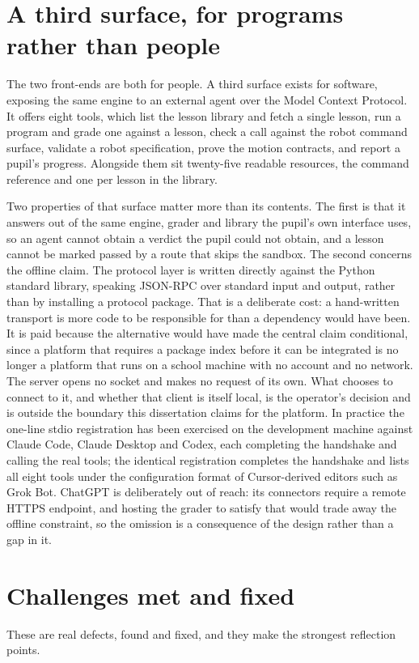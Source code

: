 \documentclass[11pt,a4paper]{report}
\begin{document}
\section{A third surface, for programs rather than people}
The two front-ends are both for people. A third surface exists for software, exposing the same engine to an external agent over the Model Context Protocol. It offers eight tools, which list the lesson library and fetch a single lesson, run a program and grade one against a lesson, check a call against the robot command surface, validate a robot specification, prove the motion contracts, and report a pupil's progress. Alongside them sit twenty-five readable resources, the command reference and one per lesson in the library.

Two properties of that surface matter more than its contents. The first is that it answers out of the same engine, grader and library the pupil's own interface uses, so an agent cannot obtain a verdict the pupil could not obtain, and a lesson cannot be marked passed by a route that skips the sandbox. The second concerns the offline claim. The protocol layer is written directly against the Python standard library, speaking JSON-RPC over standard input and output, rather than by installing a protocol package. That is a deliberate cost: a hand-written transport is more code to be responsible for than a dependency would have been. It is paid because the alternative would have made the central claim conditional, since a platform that requires a package index before it can be integrated is no longer a platform that runs on a school machine with no account and no network. The server opens no socket and makes no request of its own. What chooses to connect to it, and whether that client is itself local, is the operator's decision and is outside the boundary this dissertation claims for the platform. In practice the one-line stdio registration has been exercised on the development machine against Claude Code, Claude Desktop and Codex, each completing the handshake and calling the real tools; the identical registration completes the handshake and lists all eight tools under the configuration format of Cursor-derived editors such as Grok Bot. ChatGPT is deliberately out of reach: its connectors require a remote HTTPS endpoint, and hosting the grader to satisfy that would trade away the offline constraint, so the omission is a consequence of the design rather than a gap in it.

\section{Challenges met and fixed}
These are real defects, found and fixed, and they make the strongest reflection points.
\end{document}
